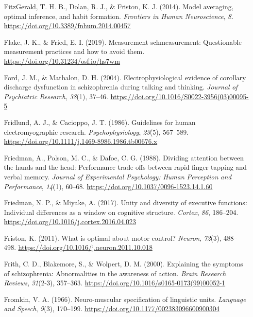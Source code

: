 \documentclass[a4paper,12pt,twoside,onecolumn,openright,final,oldfontcommands]{memoir}
\begin{document}
\leavevmode\hypertarget{ref-fitzgerald_model_2014}{}%
FitzGerald, T. H. B., Dolan, R. J., \& Friston, K. J. (2014). Model averaging, optimal inference, and habit formation. \emph{Frontiers in Human Neuroscience}, \emph{8}. \url{https://doi.org/10.3389/fnhum.2014.00457}

\leavevmode\hypertarget{ref-flake_measurement_2019}{}%
Flake, J. K., \& Fried, E. I. (2019). Measurement schmeasurement: Questionable measurement practices and how to avoid them. \url{https://doi.org/10.31234/osf.io/hs7wm}

\leavevmode\hypertarget{ref-ford_electrophysiological_2004}{}%
Ford, J. M., \& Mathalon, D. H. (2004). Electrophysiological evidence of corollary discharge dysfunction in schizophrenia during talking and thinking. \emph{Journal of Psychiatric Research}, \emph{38}(1), 37--46. \url{https://doi.org/10.1016/S0022-3956(03)00095-5}

\leavevmode\hypertarget{ref-fridlund_guidelines_1986}{}%
Fridlund, A. J., \& Cacioppo, J. T. (1986). Guidelines for human electromyographic research. \emph{Psychophysiology}, \emph{23}(5), 567--589. \url{https://doi.org/10.1111/j.1469-8986.1986.tb00676.x}

\leavevmode\hypertarget{ref-friedman_dividing_1988}{}%
Friedman, A., Polson, M. C., \& Dafoe, C. G. (1988). Dividing attention between the hands and the head: Performance trade-offs between rapid finger tapping and verbal memory. \emph{Journal of Experimental Psychology: Human Perception and Performance}, \emph{14}(1), 60--68. \url{https://doi.org/10.1037/0096-1523.14.1.60}

\leavevmode\hypertarget{ref-friedman_unity_2017}{}%
Friedman, N. P., \& Miyake, A. (2017). Unity and diversity of executive functions: Individual differences as a window on cognitive structure. \emph{Cortex}, \emph{86}, 186--204. \url{https://doi.org/10.1016/j.cortex.2016.04.023}

\leavevmode\hypertarget{ref-friston_what_2011}{}%
Friston, K. (2011). What is optimal about motor control? \emph{Neuron}, \emph{72}(3), 488--498. \url{https://doi.org/10.1016/j.neuron.2011.10.018}

\leavevmode\hypertarget{ref-frith_explaining_2000}{}%
Frith, C. D., Blakemore, S., \& Wolpert, D. M. (2000). Explaining the symptoms of schizophrenia: Abnormalities in the awareness of action. \emph{Brain Research Reviews}, \emph{31}(2-3), 357--363. \url{https://doi.org/10.1016/s0165-0173(99)00052-1}

\leavevmode\hypertarget{ref-fromkin_neuro-muscular_1966}{}%
Fromkin, V. A. (1966). Neuro-muscular specification of linguistic units. \emph{Language and Speech}, \emph{9}(3), 170--199. \url{https://doi.org/10.1177/002383096600900304}
\end{document}
